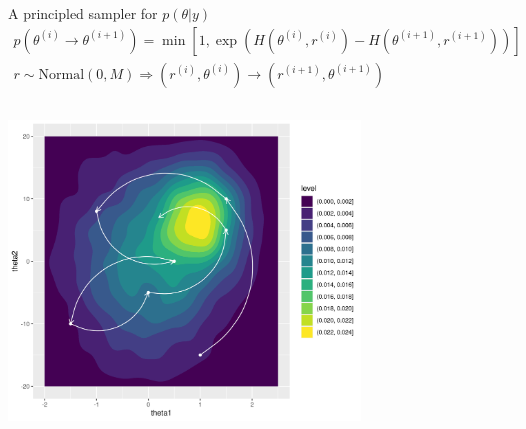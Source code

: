 \documentclass[bigger]{beamer}
\begin{document}
\begin{frame}[label={sec:org8a0df4f}]{A principled sampler for \(p(\theta|y)\)}
\begin{align*}
  p(\theta^{(i)} \rightarrow \theta^{(i+1)}) =\min\left[
    1, \exp{(H(\theta^{(i)}, r^{(i)}) - H(\theta^{(i+1)}, r^{(i+1)}))}
  \right]\\
  r \sim \text{Normal}(0, M) \Longrightarrow
  (r^{(i)}, \theta^{(i)}) \rightarrow (r^{(i+1)}, \theta^{(i+1)})
\end{align*}
\begin{columns}
\begin{column}{0.7\columnwidth}
\begin{center}
\includegraphics[width=0.7\textwidth]{./figure/sampler_path.png}
\end{center}
\end{column}


\end{columns}
\end{frame}
\end{document}
